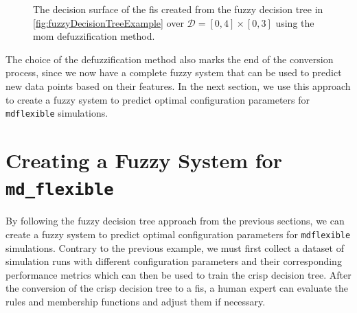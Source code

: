 \begin{multicols}{2}
    \columnbreak

    \begin{figure}[H]
        \caption[Decision surface of the fuzzy rules using MOM method]{The decision surface of the  \gls{fis} created from the fuzzy decision tree in \autoref{fig:fuzzyDecisionTreeExample} over $\mathcal{D}=[0,4]\times[0,3]$ using the \gls{mom} defuzzification method.}
        \label{fig:fuzzyDecisionSurfaceExampleMOM}
    \end{figure}
\end{multicols}

\noindent The choice of the defuzzification method also marks the end of the conversion process, since we now have a complete fuzzy system that can be used to predict new data points based on their features. In the next section, we use this approach to create a fuzzy system to predict optimal configuration parameters for \texttt{\gls{mdflexible}} simulations.

\section{Creating a Fuzzy System for \texttt{md\_flexible}}

By following the fuzzy decision tree approach from the previous sections, we can create a fuzzy system to predict optimal configuration parameters for \texttt{\gls{mdflexible}} simulations. Contrary to the previous example, we must first collect a dataset of simulation runs with different configuration parameters and their corresponding performance metrics which can then be used to train the crisp decision tree. After the conversion of the crisp decision tree to a \gls{fis}, a human expert can evaluate the rules and membership functions and adjust them if necessary.

